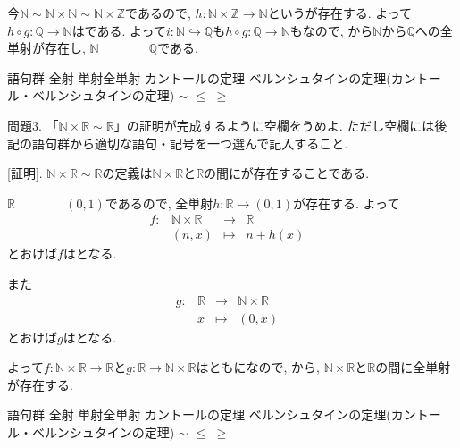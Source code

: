 \documentclass[dvipdfmx,a4paper,11pt]{article}
\newcommand{\R}{\mathbb{R}}
\newcommand{\Z}{\mathbb{Z}}
\newcommand{\Q}{\mathbb{Q}}
\newcommand{\N}{\mathbb{N}}
\theoremstyle{definition}
\begin{document}
今$\N \sim \N \times \N \sim \N \times \Z$であるので, $h : \N \times \Z \to \N$という\boxed{\phantom{hogehoge}}が存在する. 
よって$h \circ g : \Q \to \N$は\boxed{\phantom{hogehoge}}である.
よって$i : \N \hookrightarrow \Q$も$h \circ g : \Q \to \N$も\boxed{\phantom{hogehoge}}なので, \boxed{\phantom{hogehoge}}
から$\N$から$\Q$への全単射が存在し, $\N \boxed{\phantom{hogehoge}}\Q$である. 

\begin{itembox}[l]{語句群}
全射 \quad 単射\quad 全単射 
\quad カントールの定理 \quad ベルンシュタインの定理(カントール・ベルンシュタインの定理)
\quad $\sim$ \quad $\le$ \quad $\ge$ 
\end{itembox}



問題3.  「$\N \times \R \sim \R$」の証明が完成するように空欄をうめよ. 
ただし空欄には後記の語句群から適切な語句・記号を一つ選んで記入すること.

[証明]. $\N \times \R\sim \R$の定義は$\N \times \R$と$\R$の間に\boxed{\phantom{hogehoge}}が存在することである.

$\R \boxed{\phantom{hogehoge}}(0,1)$であるので, 全単射$h : \R \to (0,1)$が存在する. 
よって
  $$
\begin{array}{ccccc}
f: &\N \times \R& \rightarrow & \R& \\
&(n,x)& \longmapsto & 
n+h(x)
 &
\end{array}
$$
とおけば$f$は\boxed{\phantom{hogehoge}}となる.

また
  $$
\begin{array}{ccccc}
g: &\R& \rightarrow &\N \times \R& \\
&x& \longmapsto & 
(0,x)
 &
\end{array}
$$
とおけば$g$は\boxed{\phantom{hogehoge}}となる.

よって$f : \N \times \R \to \R$と$g : \R \to \N \times \R$はともに\boxed{\phantom{hogehoge}}なので, \boxed{\phantom{hogehoge}}から, $\N \times \R$と$\R$の間に全単射が存在する.


\begin{itembox}[l]{語句群}
全射 \quad 単射\quad 全単射 
\quad カントールの定理 \quad ベルンシュタインの定理(カントール・ベルンシュタインの定理)
\quad $\sim$ \quad $\le$ \quad $\ge$
\end{itembox}
\end{document}
